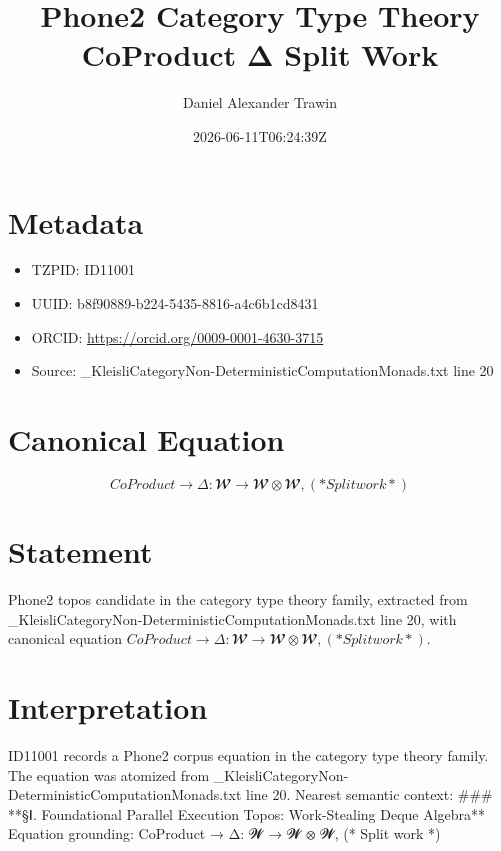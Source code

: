 \documentclass[11pt]{article}
\title{Phone2 Category Type Theory CoProduct Δ Split Work}
\author{Daniel Alexander Trawin}
\date{2026-06-11T06:24:39Z}
\begin{document}
\maketitle
\section*{Metadata}
\begin{itemize}
\item TZPID: ID11001
\item UUID: b8f90889-b224-5435-8816-a4c6b1cd8431
\item ORCID: \url{https://orcid.org/0009-0001-4630-3715}
\item Source: _KleisliCategoryNon-DeterministicComputationMonads.txt line 20
\end{itemize}
\section*{Canonical Equation}
\[
CoProduct → Δ: 𝓦 → 𝓦 ⊗ 𝓦, (* Split work *)
\]
\section*{Statement}
Phone2 topos candidate in the category type theory family, extracted from _KleisliCategoryNon-DeterministicComputationMonads.txt line 20, with canonical equation $CoProduct → Δ: 𝓦 → 𝓦 ⊗ 𝓦, (* Split work *)$.
\section*{Interpretation}
ID11001 records a Phone2 corpus equation in the category type theory family. The equation was atomized from _KleisliCategoryNon-DeterministicComputationMonads.txt line 20. Nearest semantic context: ### **§Ⅰ. Foundational Parallel Execution Topos: Work-Stealing Deque Algebra** Equation grounding: CoProduct → Δ: 𝓦 → 𝓦 ⊗ 𝓦, (* Split work *)
\end{document}
